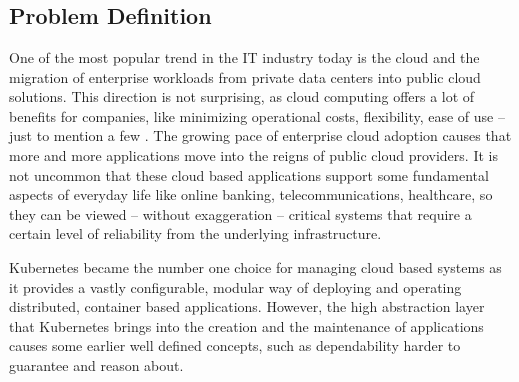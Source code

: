 \chapter{\bevezetes}

\section{Problem Definition}

One of the most popular trend in the IT industry today is the cloud and the migration of enterprise workloads from private data centers into public cloud solutions. This direction is not surprising, as cloud computing offers a lot of benefits for companies, like minimizing operational costs, flexibility, ease of use -- just to mention a few \cite{CloudComputingStatistics}. The growing pace of enterprise cloud adoption causes that more and more applications move into the reigns of public cloud providers. It is not uncommon that these cloud based applications support some fundamental aspects of everyday life like online banking, telecommunications, healthcare, so they can be viewed -- without exaggeration -- critical systems that require a certain level of reliability from the underlying infrastructure.

Kubernetes became the number one choice for managing cloud based systems as it provides a vastly configurable, modular way of deploying and operating distributed, container based applications. However, the high abstraction layer that Kubernetes brings into the creation and the maintenance of applications causes some earlier well defined concepts, such as dependability harder to guarantee and reason about.


